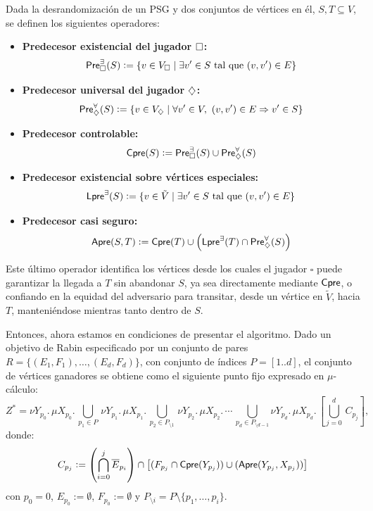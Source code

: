 Dada la desrandomización de un PSG y dos conjuntos de vértices en él, \( S, T
\subseteq V \), se definen los siguientes operadores: %

\begin{itemize}
	\item \textbf{Predecesor existencial del jugador \( \square \):}
	      \[
		      \textsf{Pre}_\square^\exists(S) := \{v \in V_\square \mid \exists v' \in S \text{ tal que } (v, v') \in E\}
	      \]

	\item \textbf{Predecesor universal del jugador \( \diamondsuit \):}
	      \[
		      \textsf{Pre}_\diamondsuit^\forall(S) := \{v \in V_\diamondsuit \mid \forall v' \in V,\ (v, v') \in E \Rightarrow v' \in S\}
	      \]

	\item \textbf{Predecesor controlable:}
	      \[
		      \textsf{Cpre}(S) := \textsf{Pre}_\square^\exists(S) \cup \textsf{Pre}_\diamondsuit^\forall(S)
	      \]

	\item \textbf{Predecesor existencial sobre vértices especiales:}
	      \[
		      \textsf{Lpre}^\exists(S) := \{v \in \tilde V \mid \exists v' \in S \text{ tal que } (v, v') \in E\}
	      \]

	\item \textbf{Predecesor casi seguro:}
	      \[
		      \textsf{Apre}(S, T) := \textsf{Cpre}(T) \cup \left( \textsf{Lpre}^\exists(T) \cap \textsf{Pre}_\diamondsuit^\forall(S) \right)
	      \]
\end{itemize}

Este último operador identifica los vértices desde los cuales el jugador \(
\square \) puede garantizar la llegada a \( T \) sin abandonar \( S \), ya sea
directamente mediante \( \textsf{Cpre} \), o confiando en la equidad del adversario
para transitar, desde un vértice en $\tilde V$, hacia \( T \), manteniéndose
mientras tanto dentro de \( S \).

Entonces, ahora estamos en condiciones de presentar el algoritmo. Dado un
objetivo de Rabin especificado por un conjunto de pares $R = \{(E_1, F_1),
	\dots, (E_d, F_d)\}$, con conjunto de índices $P = [1..d]$, el conjunto de
vértices ganadores se obtiene como el siguiente punto fijo expresado en
$\mu$-cálculo:
\[
	Z^* = \nu Y_{p_0}.\, \mu X_{p_0}.\, \bigcup_{p_1 \in P}\, \nu Y_{p_1}.\, \mu X_{p_1}.\, \bigcup_{p_2 \in P_{\setminus 1}}\, \nu Y_{p_2}.\, \mu X_{p_2} .\, \cdots\, \bigcup_{p_d \in P_{\setminus d-1}} \nu Y_{p_d}.\, \mu X_{p_d}.\, \left[ \bigcup_{j=0}^d\, C_{p_j} \right],
\]
donde:
\[
	C_{p_j} := \left( \bigcap_{i=0}^j \overline{E}_{p_i} \right) \cap \left[ (F_{p_j} \cap \textsf{Cpre}(Y_{p_j})) \cup (\textsf{Apre}(Y_{p_j}, X_{p_j})) \right]
\]
\hspace{-0.63cm}con $p_0 = 0$, \( E_{p_0} := \emptyset \), $F_{p_0} := \emptyset$ y
$P_{\setminus i} = P \setminus \{p_1, \dots, p_i\}$.

